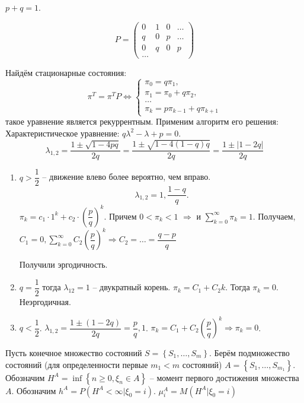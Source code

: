\begin{ex}
  $p+q=1$.

  \[
    P = \begin{pmatrix}
      0 & 1 & 0 & \dots \\
      q & 0 & p & \dots \\
      0 & q & 0 & p \\
      \dots
    \end{pmatrix} 
  \]

  Найдём стационарные состояния:
  \[
    \pi^T = \pi^T P \Leftrightarrow
    \begin{cases}
      \pi_0 = q \pi_1, \\
      \pi_1 = \pi_0 + q \pi_2, \\
      \dots \\
      \pi_k = p \pi_{k-1} + q \pi_{k+1}
    \end{cases}
  \]
  такое уравнение является рекуррентным. Применим алгоритм его решения:
  Характеристическое уравнение: $q \lambda^2 - \lambda + p = 0$.
  \[
    \lambda_{1, 2} = \dfrac{1\pm \sqrt{1-4pq}}{2q} = \dfrac{1 \pm \sqrt{1 - 4(1-q)q}}{2q}
    = \dfrac{1 \pm |1 - 2q|}{2q}
  \]
  \begin{enumerate}
    \item $q > \dfrac{1}{2}$ -- движение влево более вероятно, чем вправо.
      \[
        \lambda_{1, 2} = 1, \dfrac{1-q}{q}.
      \]
      $\pi_k = c_1 \cdot 1^k + c_2 \cdot \left( \dfrac{p}{q} \right)^k$.
      Причем $0 < \pi_k < 1$ $\Rightarrow$ и $\sum_{k=0}^\infty \pi_k = 1$.
      Получаем, $C_1 = 0, \sum_{k=0}^\infty C_2 \left( \dfrac{p}{q} \right)^k 
      \Rightarrow C_2 = \dots = \dfrac{q-p}{q}$

      Получили эргодичность.

    \item $q = \dfrac{1}{2}$ тогда $\lambda_{12} = 1$ -- двукратный корень. $\pi_k = C_1 + C_2 k$. 
      Тогда $\pi_k = 0$. Неэргодичная.

    \item $q<\dfrac{1}{2}$. $\lambda_{1, 2} = \dfrac{1 \pm (1-2q)}{2q} = \dfrac{p}{q}, 1$.
      $\pi_k = C_1 + C_2 \left(\dfrac{p}{q}\right)^{k} \Rightarrow \pi_k = 0$.
  \end{enumerate}
\end{ex}

\begin{definition}
  Пусть конечное множество состояний $S = \left\{ S_1, \dots, S_m \right\} $. Берём подмножество 
  состояний (для определенности первые $m_1 < m$ состояний)
  $A = \left\{ S_1, \dots, S_{m_1} \right\} $.
  Обозначим $H^A = \inf \left\{ n\geqslant 0, \xi_n \in A \right\} $ -- момент первого достижения 
  множества $A$.
  Обозначим $h^A = P(H^A < \infty | \xi_0 = i)$.
  $\mu^A_i = M(H^A | \xi_0 = i)$
\end{definition}

